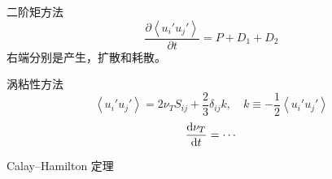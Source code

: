 \documentclass[12pt]{ctexart}
\begin{document}
二阶矩方法
\begin{equation}
   \frac{\partial \left< u_i' u_j' \right> }{\partial t} = P + D_1 + D_2
\end{equation}
右端分别是产生，扩散和耗散。

涡粘性方法
\begin{equation}
   \left< u_i' u_j' \right>  = 2\nu_T S_{ij} + \frac{2}{3} \delta_{ij} k ,\quad k \equiv - \frac{1}{2} \left< u_i' u_j' \right> 
\end{equation}
\begin{equation}
   \frac{\dif \nu_T}{\dif t} = \cdots
\end{equation}

Calay--Hamilton 定理



















% 
\end{document}
